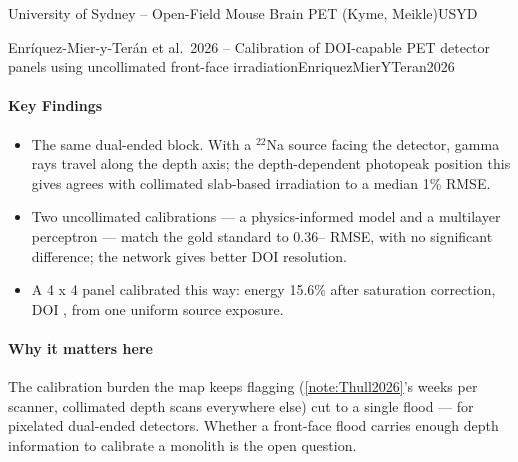 \begin{programnote}{University of Sydney -- Open-Field Mouse Brain PET (Kyme, Meikle)}{USYD}
\begin{papernote}{Enríquez-Mier-y-Terán et al.\ 2026 -- Calibration of DOI-capable PET detector panels using uncollimated front-face irradiation}{EnriquezMierYTeran2026}
\paragraph{Key Findings}
\begin{itemize}
	\item The same dual-ended block. With a $^{22}$Na source facing the
		detector, gamma rays travel along the depth axis; the depth-dependent
		photopeak position this gives agrees with collimated slab-based
		irradiation to a median 1\% RMSE.
	\item Two uncollimated calibrations --- a physics-informed model and a
		multilayer perceptron --- match the gold standard to 0.36--
		RMSE, with no significant difference; the network gives better DOI
		resolution.
	\item A 4 x 4 panel calibrated this way: energy 15.6\% after saturation
		correction, DOI , from one uniform source exposure.
\end{itemize}

\paragraph{Why it matters here}
The calibration burden the map keeps flagging (\ref{note:Thull2026}'s weeks
per scanner, collimated depth scans everywhere else) cut to a single flood ---
for pixelated dual-ended detectors. Whether a front-face flood carries enough
depth information to calibrate a monolith is the open question.
\end{papernote}

\end{programnote}

 
 
 
